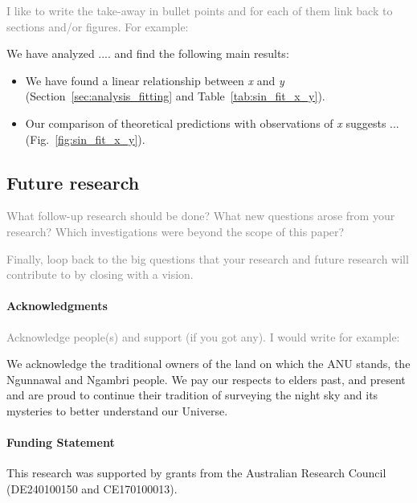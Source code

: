 \documentclass[
  journal=pasa,
  manuscript=Research-Article,
  year=2025,
  volume=X,
]{cup-journal}
\newcommand{\comment}[1]{\textcolor{gray}{#1}}
\begin{document}
\comment{I like to write the take-away in bullet points and for each of them link back to sections and/or figures. For example:}

We have analyzed .... and find the following main results:
\begin{itemize}
    \item We have found a linear relationship between \textit{x} and \textit{y} (Section~\ref{sec:analysis_fitting} and Table~\ref{tab:sin_fit_x_y}).
    \item Our comparison of theoretical predictions with observations of  \textit{x} suggests ... (Fig.~\ref{fig:sin_fit_x_y}).
\end{itemize}

\subsection{Future research} \label{sec:conclusions_future_research}

\comment{What follow-up research should be done? What new questions arose from your research? Which investigations were beyond the scope of this paper?}

\comment{Finally, loop back to the big questions that your research and future research will contribute to by closing with a vision.}

\clearpage

\paragraph{Acknowledgments}

\comment{Acknowledge people(s) and support (if you got any). I would write for example:}

We acknowledge the traditional owners of the land on which the ANU stands, the Ngunnawal and Ngambri people. We pay our respects to elders past, and present and are proud to continue their tradition of surveying the night sky and its mysteries to better understand our Universe.

\paragraph{Funding Statement}
This research was supported by grants from the Australian Research Council (DE240100150 and CE170100013).
\end{document}
